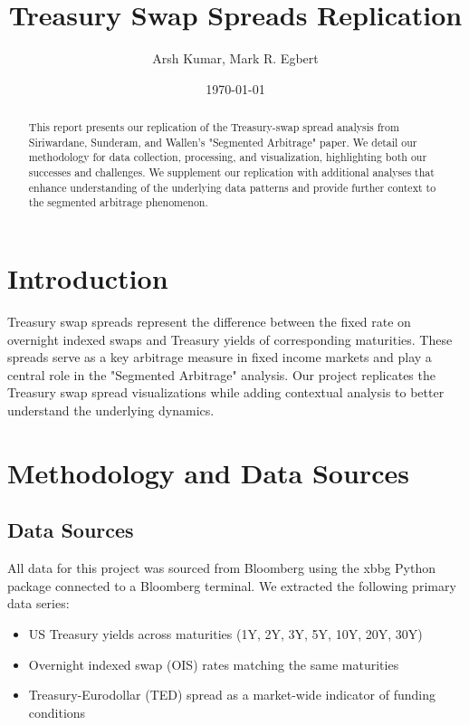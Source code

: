 \documentclass[12pt]{article}
\title{Treasury Swap Spreads Replication}
\author{Arsh Kumar, Mark R. Egbert}
\date{\today}
\begin{document}
\maketitle

\begin{abstract}
This report presents our replication of the Treasury-swap spread analysis from Siriwardane, Sunderam, and Wallen's "Segmented Arbitrage" paper. We detail our methodology for data collection, processing, and visualization, highlighting both our successes and challenges. We supplement our replication with additional analyses that enhance understanding of the underlying data patterns and provide further context to the segmented arbitrage phenomenon.
\end{abstract}

\section{Introduction}

Treasury swap spreads represent the difference between the fixed rate on overnight indexed swaps and Treasury yields of corresponding maturities. These spreads serve as a key arbitrage measure in fixed income markets and play a central role in the "Segmented Arbitrage"\citet{NBERw30561} analysis. Our project replicates the Treasury swap spread visualizations while adding contextual analysis to better understand the underlying dynamics.

\section{Methodology and Data Sources}

\subsection{Data Sources}

All data for this project was sourced from Bloomberg using the xbbg Python package connected to a Bloomberg terminal. We extracted the following primary data series:

\begin{itemize}
    \item US Treasury yields across maturities (1Y, 2Y, 3Y, 5Y, 10Y, 20Y, 30Y)
    \item Overnight indexed swap (OIS) rates matching the same maturities
    \item Treasury-Eurodollar (TED) spread as a market-wide indicator of funding conditions
\end{itemize}
\end{document}
